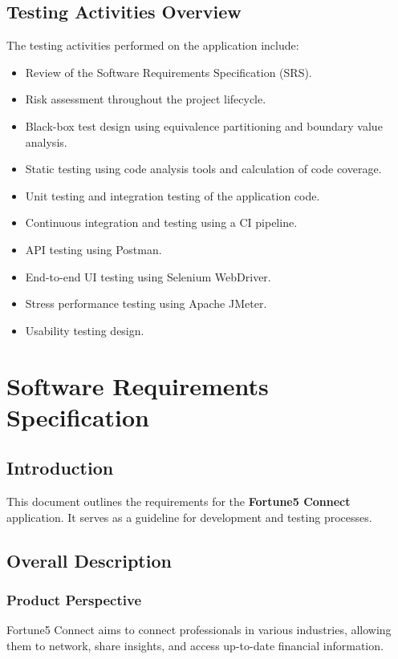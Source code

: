\documentclass[12pt,a4paper]{report}
\begin{document}
\section{Testing Activities Overview}
The testing activities performed on the application include:

\begin{itemize}
    \item Review of the Software Requirements Specification (SRS).
    \item Risk assessment throughout the project lifecycle.
    \item Black-box test design using equivalence partitioning and boundary value analysis.
    \item Static testing using code analysis tools and calculation of code coverage.
    \item Unit testing and integration testing of the application code.
    \item Continuous integration and testing using a CI pipeline.
    \item API testing using Postman.
    \item End-to-end UI testing using Selenium WebDriver.
    \item Stress performance testing using Apache JMeter.
    \item Usability testing design.
\end{itemize}

\chapter{Software Requirements Specification}
\section{Introduction}
This document outlines the requirements for the \textbf{Fortune5 Connect} application. It serves as a guideline for development and testing processes.

\section{Overall Description}
\subsection{Product Perspective}
Fortune5 Connect aims to connect professionals in various industries, allowing them to network, share insights, and access up-to-date financial information.
\end{document}
